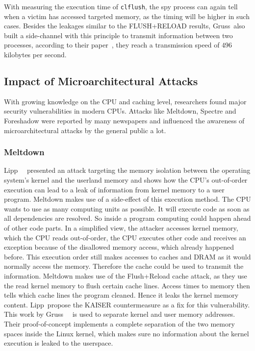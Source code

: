 With measuring the execution time of \texttt{clflush}, the spy process can again
tell when a victim has accessed targeted memory, as the timing will be higher in
such cases. Besides the leakages similar to the FLUSH+RELOAD results,
Gruss~\etal also built a side-channel with this principle to transmit
information between two processes, according to their paper~\cite{flushflush},
they reach a transmission speed of $496$ kilobytes per second.

\subsection{Impact of Microarchitectural Attacks}

With growing knowledge on the CPU and caching level, researchers found major
security vulnerabilities in modern CPUs. Attacks like Meltdown, Spectre and
Foreshadow were reported by many newspapers and influenced the awareness of
microarchitectural attacks by the general public a lot.

\subsubsection{Meltdown}

Lipp~\etal~\cite{meltdown} presented an attack targeting the memory isolation
between the operating system's kernel and the userland memory and shows how the
CPU's out-of-order execution can lead to a leak of information from kernel
memory to a user program. Meltdown makes use of a side-effect of this execution
method. The CPU wants to use as many computing units as possible. It will
execute code as soon as all dependencies are resolved. So inside a program
computing could happen ahead of other code parts. In a simplified view, the
attacker accesses kernel memory, which the CPU reads out-of-order, the CPU
executes other code and receives an exception because of the disallowed memory
access, which already happened before. This execution order still makes
accesses to caches and DRAM as it would normally access the memory. Therefore
the cache could be used to transmit the information. Meltdown makes use of the
Flush+Reload cache attack, as they use the read kernel memory to flush certain
cache lines. Access times to memory then tells which cache lines the program
cleaned. Hence it leaks the kernel memory content. Lipp~\etal propose the
KAISER countermeasure as a fix for this vulnerability. This work by
Gruss~\etal~\cite{kaiserpaper} is used to separate kernel and user memory
addresses. Their proof-of-concept implements a complete separation of the two
memory spaces inside the Linux kernel, which makes sure no information about the
kernel execution is leaked to the userspace.

